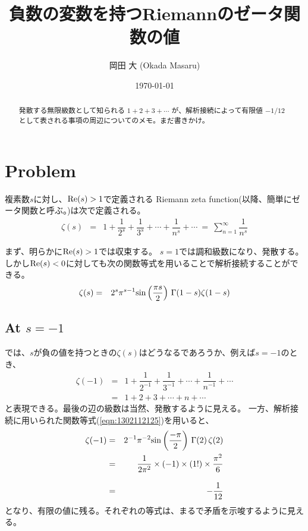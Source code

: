 \documentclass[uplatex,a4j,12pt,dvipdfmx]{jsarticle}
\title{負数の変数を持つRiemannのゼータ関数の値}
\author{岡田 大 (Okada Masaru)}
\date{\today}
\begin{document}
\allowdisplaybreaks
\maketitle

\begin{abstract}
	発散する無限級数として知られる $1+2+3+\cdots$ が、解析接続によって有限値 $-1/12$ として表される事項の周辺についてのメモ。まだ書きかけ。
\end{abstract}

\section{Problem}

複素数$s$に対し、${\rm Re}(s) > 1$で定義される
Riemann zeta function(以降、簡単にゼータ関数と呼ぶ。)は次で定義される。
\begin{eqnarray}
	\zeta(s)
	&=&
	1
	+
	\dfrac{1}{2^{s}}
	+
	\dfrac{1}{3^{s}}
	+
	\cdots
	+
	\dfrac{1}{n^{s}}
	+
	\cdots
	\ = \
	\sum_{n=1}^{\infty}
	\dfrac{1}{n^{s}}
\end{eqnarray}

まず、明らかに${\rm Re}(s) >1$では収束する。
$s=1$では調和級数になり、発散する。
しかし${\rm Re}(s) < 0$に対しても次の関数等式を用いることで解析接続することができる。
\begin{eqnarray}
	\zeta(s)
	&=&
	2^{s}
	\pi^{s-1}
	{\rm sin}
	\left(
	\dfrac{\pi s}{2}
	\right)
	\ \!
	\Gamma(1-s)
	\zeta(1-s)
	\label{eqn:1302112125}
\end{eqnarray}

\subsection{At $s=-1$}

では、$s$が負の値を持つときの$\zeta(s)$はどうなるであろうか、例えば$s=-1$のとき、
\begin{eqnarray}
	\zeta(-1)
	&=&
	1
	+
	\dfrac{1}{2^{-1}}
	+
	\dfrac{1}{3^{-1}}
	+
	\cdots
	+
	\dfrac{1}{n^{-1}}
	+
	\cdots
	\nonumber \\[3mm] &=&
	1+2+3+\cdots+n+\cdots
\end{eqnarray}
と表現できる。最後の辺の級数は当然、発散するように見える。
一方、解析接続に用いられた関数等式(\ref{eqn:1302112125})を用いると、
\begin{eqnarray}
	\zeta(-1)
	&=&
	2^{-1}
	\pi^{-2}
	{\rm sin}
	\left(
	\frac{- \pi}{2}
	\right)
	\ \!
	\Gamma(2)
	\ \!
	\zeta(2)
	\nonumber \\ &=&
	\frac{1}{2 \pi^{2}}
	\times
	(-1)
	\times
	(1!)
	\times
	\frac{\pi^{2}}{6}
	\nonumber \\[3mm] &=&
	- \frac{1}{12}
\end{eqnarray}
となり、有限の値に残る。それぞれの等式は、まるで矛盾を示唆するように見える。
\end{document}
